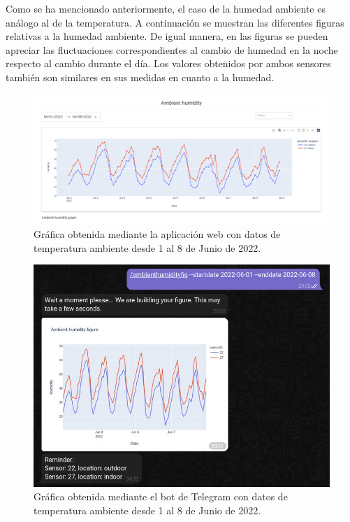 \documentclass[a4paper, 12pt, oneside]{book}
\begin{document}
Como se ha mencionado anteriormente, el caso de la humedad ambiente es análogo al de la temperatura. A continuación se muestran las diferentes figuras relativas a la humedad ambiente. De igual manera, en las figuras se pueden apreciar las fluctuaciones correspondientes al cambio de humedad en la noche respecto al cambio durante el día. Los valores obtenidos por ambos sensores también son similares en sus medidas en cuanto a la humedad.
 
\begin{figure}[H]
	\centering
    \includegraphics[width=12cm, keepaspectratio]{img/ambient_humidity_01_08_junio}
    \caption{Gráfica obtenida mediante la aplicación web con datos de temperatura ambiente desde 1 al 8 de Junio de 2022.}
    \label{figura:ambient_humidity_01_08_junio}
\end{figure}
\begin{figure}[H]
	\centering
    \includegraphics[width=12cm, keepaspectratio]{img/telegram_ambient_humidity_01_08_junio}
    \caption{Gráfica obtenida mediante el bot de Telegram con datos de temperatura ambiente desde 1 al 8 de Junio de 2022.}
    \label{figura:telegram_ambient_humidity_01_08_junio}
\end{figure}
\end{document}
